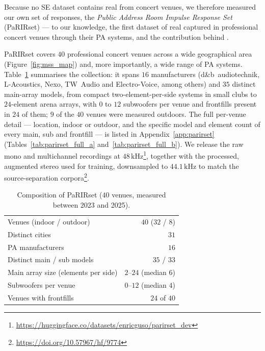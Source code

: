 Because no \acrshort{SE} dataset contains real  from concert venues, we therefore measured our own set of responses, the \emph{Public Address Room Impulse Response Set}
(PaRIRset) --- to our knowledge, the first dataset of real 
captured in professional concert venues through their \acrshort{PA} systems, and
the contribution behind .

PaRIRset covers $40$ professional concert venues across a wide geographical area
(Figure~\ref{fig:mss_map}) and, more importantly, a wide range of \acrshort{PA}
systems. Table~\ref{tab:parirset_meta} summarises the collection: it spans $16$
manufacturers (d\&b~audiotechnik, L-Acoustics, Nexo, TW~Audio and
Electro-Voice, among others) and $35$ distinct main-array models, from compact
two-element-per-side systems in small clubs to $24$-element arena arrays, with
$0$ to $12$ subwoofers per venue and frontfills present in $24$ of them; $9$ of
the $40$ venues were measured outdoors. The full per-venue detail --- location,
indoor or outdoor, and the specific model and element count of every main, sub
and frontfill --- is listed in Appendix~\ref{app:parirset}
(Tables~\ref{tab:parirset_full_a} and~\ref{tab:parirset_full_b}). We release the
raw mono and multichannel recordings at $48\,\text{kHz}$\footnote{\url{https://huggingface.co/datasets/enricguso/parirset_dev}}, together with the
processed, augmented stereo  used for training, downsampled to
$44.1\,\text{kHz}$ to match the source-separation corpora\footnote{\url{https://doi.org/10.57967/hf/9774}}.



\begin{table}[htbp]
\centering\footnotesize
\caption{Composition of PaRIRset ($40$ venues, measured between 2023 and 2025).}
\label{tab:parirset_meta}
\begin{tabular}{@{}lr@{}}
  \toprule
  Venues (indoor / outdoor)          & $40$ ($32$ / $8$) \\
  Distinct cities                    & $31$ \\
  \acrshort{PA} manufacturers        & $16$ \\
  Distinct main / sub models         & $35$ / $33$ \\
  Main array size (elements per side)& $2$--$24$ (median $6$) \\
  Subwoofers per venue               & $0$--$12$ (median $4$) \\
  Venues with frontfills             & $24$ of $40$ \\
  \bottomrule
\end{tabular}
\end{table}

